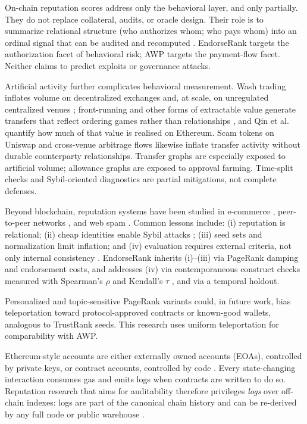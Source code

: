 On-chain reputation scores address only the behavioral layer, and only partially. They do not replace collateral, audits, or oracle design. Their role is to summarize relational structure (who authorizes whom; who pays whom) into an ordinal signal that can be audited and recomputed . EndorseRank targets the authorization facet of behavioral risk; AWP targets the payment-flow facet. Neither claims to predict exploits or governance attacks.

Artificial activity further complicates behavioral measurement. Wash trading inflates volume on decentralized exchanges  and, at scale, on unregulated centralized venues ; front-running and other forms of extractable value generate transfers that reflect ordering games rather than relationships , and Qin et al. quantify how much of that value is realised on Ethereum. Scam tokens on Uniswap  and cross-venue arbitrage flows  likewise inflate transfer activity without durable counterparty relationships. Transfer graphs are especially exposed to artificial volume; allowance graphs are exposed to approval farming. Time-split checks and Sybil-oriented diagnostics are partial mitigations, not complete defenses.


Beyond blockchain, reputation systems have been studied in e-commerce , peer-to-peer networks , and web spam . Common lessons include: (i) reputation is relational; (ii) cheap identities enable Sybil attacks ; (iii) seed sets and normalization limit inflation; and (iv) evaluation requires external criteria, not only internal consistency . EndorseRank inherits (i)--(iii) via PageRank damping and endorsement costs, and addresses (iv) via contemporaneous construct checks measured with Spearman's $\rho$  and Kendall's $\tau$ , and via a temporal holdout.

Personalized and topic-sensitive PageRank variants  could, in future work, bias teleportation toward protocol-approved contracts or known-good wallets, analogous to TrustRank seeds. This research uses uniform teleportation for comparability with AWP.


Ethereum-style accounts are either externally owned accounts (EOAs), controlled by private keys, or contract accounts, controlled by code . Every state-changing interaction consumes gas and emits logs when contracts are written to do so. Reputation research that aims for auditability therefore privileges \emph{logs} over off-chain indexes: logs are part of the canonical chain history and can be re-derived by any full node or public warehouse .

